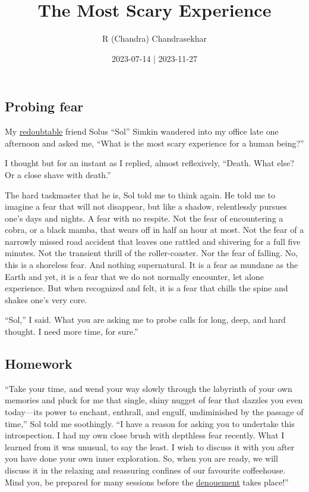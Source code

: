 \documentclass[
  a4paper,
]{article}
\title{The Most Scary Experience}
\author{R (Chandra) Chandrasekhar}
\date{2023-07-14 | 2023-11-27}
\begin{document}
\maketitle

\thispagestyle{empty}


\hypertarget{probing-fear}{%
\subsection{Probing fear}\label{probing-fear}}

My \href{https://www.thefreedictionary.com/redoubtable}{redoubtable}
friend Solus ``Sol'' Simkin wandered into my office late one afternoon
and asked me, ``What is the most scary experience for a human being?''

I thought but for an instant as I replied, almost reflexively, ``Death.
What else? Or a close shave with death.''

The hard taskmaster that he is, Sol told me to think again. He told me
to imagine a fear that will not disappear, but like a shadow,
relentlessly pursues one's days and nights. A fear with no respite. Not
the fear of encountering a cobra, or a black mamba, that wears off in
half an hour at most. Not the fear of a narrowly missed road accident
that leaves one rattled and shivering for a full five minutes. Not the
transient thrill of the roller-coaster. Nor the fear of falling. No,
this is a shoreless fear. And nothing supernatural. It is a fear as
mundane as the Earth and yet, it is a fear that we do not normally
encounter, let alone experience. But when recognized and felt, it is a
fear that chills the spine and shakes one's very core.

``Sol,'' I said. What you are asking me to probe calls for long, deep,
and hard thought. I need more time, for sure.''

\hypertarget{homework}{%
\subsection{Homework}\label{homework}}

``Take your time, and wend your way slowly through the labyrinth of your
own memories and pluck for me that single, shiny nugget of fear that
dazzles you even today---its power to enchant, enthrall, and engulf,
undiminished by the passage of time,'' Sol told me soothingly. ``I have
a reason for asking you to undertake this introspection. I had my own
close brush with depthless fear recently. What I learned from it was
unusual, to say the least. I wish to discuss it with you after you have
done your own inner exploration. So, when you are ready, we will discuss
it in the relaxing and reassuring confines of our favourite coffeehouse.
Mind you, be prepared for many sessions before the
\href{https://www.thefreedictionary.com/denouement}{denouement} takes
place!''
\end{document}
